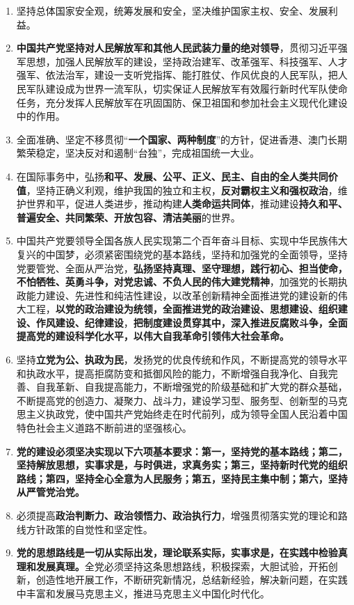 \documentclass[UTF8,11pt,a4paper]{ctexart}
\begin{document}
\begin{enumerate}[label=\arabic*., leftmargin=2.3em]
\item 坚持总体国家安全观，统筹发展和安全，坚决维护国家主权、安全、发展利益。
\item \textbf{中国共产党坚持对人民解放军和其他人民武装力量的绝对领导}，贯彻习近平强军思想，加强人民解放军的建设，坚持政治建军、改革强军、科技强军、人才强军、依法治军，建设一支听党指挥、能打胜仗、作风优良的人民军队，把人民军队建设成为世界一流军队，切实保证人民解放军有效履行新时代军队使命任务，充分发挥人民解放军在巩固国防、保卫祖国和参加社会主义现代化建设中的作用。
\item 全面准确、坚定不移贯彻“\textbf{一个国家、两种制度}”的方针，促进香港、澳门长期繁荣稳定，坚决反对和遏制“台独”，完成祖国统一大业。
\item 在国际事务中，弘扬\textbf{和平、发展、公平、正义、民主、自由的全人类共同价值}，坚持正确义利观，维护我国的独立和主权，\textbf{反对霸权主义和强权政治}，维护世界和平，促进人类进步，推动构建\textbf{人类命运共同体}，推动建设\textbf{持久和平、普遍安全、共同繁荣、开放包容、清洁美丽}的世界。
\item 中国共产党要领导全国各族人民实现第二个百年奋斗目标、实现中华民族伟大复兴的中国梦，必须紧密围绕党的基本路线，坚持和加强党的全面领导，坚持党要管党、全面从严治党，\textbf{弘扬坚持真理、坚守理想，践行初心、担当使命，不怕牺牲、英勇斗争，对党忠诚、不负人民的伟大建党精神}，加强党的长期执政能力建设、先进性和纯洁性建设，以改革创新精神全面推进党的建设新的伟大工程，\textbf{以党的政治建设为统领，全面推进党的政治建设、思想建设、组织建设、作风建设、纪律建设}，\textbf{把制度建设贯穿其中，深入推进反腐败斗争，全面提高党的建设科学化水平，以伟大自我革命引领伟大社会革命。}
\item 坚持\textbf{立党为公、执政为民}，发扬党的优良传统和作风，不断提高党的领导水平和执政水平，提高拒腐防变和抵御风险的能力，不断增强自我净化、自我完善、自我革新、自我提高能力，不断增强党的阶级基础和扩大党的群众基础，不断提高党的创造力、凝聚力、战斗力，建设学习型、服务型、创新型的马克思主义执政党，使中国共产党始终走在时代前列，成为领导全国人民沿着中国特色社会主义道路不断前进的坚强核心。
\item \textbf{党的建设必须坚决实现以下六项基本要求：第一，坚持党的基本路线；第二，坚持解放思想，实事求是，与时俱进，求真务实；第三，坚持新时代党的组织路线；第四，坚持全心全意为人民服务；第五，坚持民主集中制；第六，坚持从严管党治党。}
\item 必须提高\textbf{政治判断力、政治领悟力、政治执行力}，增强贯彻落实党的理论和路线方针政策的自觉性和坚定性。
\item \textbf{党的思想路线是一切从实际出发，理论联系实际，实事求是，在实践中检验真理和发展真理。}全党必须坚持这条思想路线，积极探索，大胆试验，开拓创新，创造性地开展工作，不断研究新情况，总结新经验，解决新问题，在实践中丰富和发展马克思主义，推进马克思主义中国化时代化。

\end{enumerate}
\end{document}
